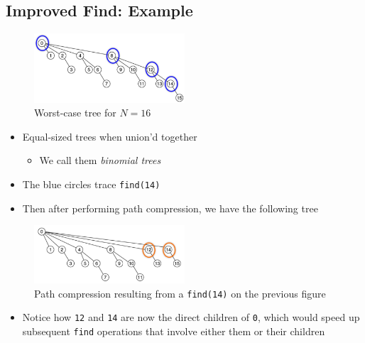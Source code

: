 \documentclass[
  10pt,
  english,
  letterpaper,
,tablecaptionabove
]{scrartcl}
\newcommand{\passthrough}[1]{#1}
\providecommand{\tightlist}{%
  \setlength{\itemsep}{0pt}\setlength{\parskip}{0pt}}
\begin{document}
\hypertarget{improved-find-example}{%
\subsection{Improved Find: Example}\label{improved-find-example}}

\begin{figure}
\centering
\includegraphics[width=0.5\textwidth,height=\textheight]{images/1.png}
\caption{Worst-case tree for \(N=16\)}
\end{figure}

\begin{itemize}
\tightlist
\item
  Equal-sized trees when union'd together

  \begin{itemize}
  \tightlist
  \item
    We call them \emph{binomial trees}
  \end{itemize}
\item
  The blue circles trace \passthrough{\lstinline!find(14)!}
\item
  Then after performing path compression, we have the following tree
\end{itemize}

\begin{figure}
\centering
\includegraphics[width=0.5\textwidth,height=\textheight]{images/2.png}
\caption{Path compression resulting from a
\passthrough{\lstinline!find(14)!} on the previous figure}
\end{figure}

\begin{itemize}
\tightlist
\item
  Notice how \passthrough{\lstinline!12!} and
  \passthrough{\lstinline!14!} are now the direct children of
  \passthrough{\lstinline!0!}, which would speed up subsequent
  \passthrough{\lstinline!find!} operations that involve either them or
  their children
\end{itemize}
\end{document}
